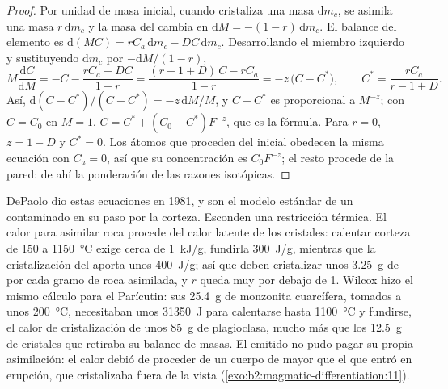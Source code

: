 \begin{proof}
Por unidad de masa inicial, cuando cristaliza una masa $\mathrm dm_c$, se asimila una masa
$r\,\mathrm dm_c$ y la masa del  cambia en $\mathrm dM =
-(1-r)\,\mathrm dm_c$. El balance del elemento es $\mathrm d(MC) = rC_a\,\mathrm dm_c -
DC\,\mathrm dm_c$. Desarrollando el miembro izquierdo y sustituyendo $\mathrm dm_c$ por
$-\mathrm dM/(1-r)$,
\[
M\frac{\mathrm dC}{\mathrm dM} = -C - \frac{rC_a - DC}{1-r}
= \frac{(r - 1 + D)\,C - rC_a}{1 - r} = -z\,\bigl(C - C^*\bigr),
\qquad C^* = \frac{rC_a}{r - 1 + D}.
\]
Así, $\mathrm d(C - C^*)/(C - C^*) = -z\,\mathrm dM/M$, y $C - C^*$ es proporcional
a $M^{-z}$; con $C = C_0$ en $M = 1$, $C = C^* + (C_0 - C^*)F^{-z}$, que es la
fórmula. Para $r = 0$, $z = 1 - D$ y $C^* = 0$. Los átomos que proceden del
 inicial obedecen la misma ecuación con $C_a = 0$, así que su concentración es
$C_0F^{-z}$; el resto procede de la pared: de ahí la ponderación de las razones isotópicas.
\end{proof}

DePaolo dio estas ecuaciones en 1981, y son el modelo estándar de un 
contaminado en su paso por la corteza. Esconden una restricción térmica. El calor
para asimilar roca procede del calor latente de los cristales: calentar corteza de
150 a \qty{1150}{\celsius} exige cerca de \qty{1}{kJ/g}, fundirla \qty{300}{J/g},
mientras que la cristalización del  aporta unos \qty{400}{J/g}; así que deben cristalizar unos \qty{3.25}{g} de
 por cada gramo de roca asimilada, y $r$ queda muy por debajo de 1.
Wilcox hizo el mismo cálculo para el Parícutin: sus \qty{25.4}{g} de monzonita
cuarcífera, tomados a unos \qty{200}{\celsius}, necesitaban unos \qty{31350}{J} para
calentarse hasta \qty{1100}{\celsius} y fundirse, el calor de cristalización de unos
\qty{85}{g} de plagioclasa, mucho más que los \qty{12.5}{g} de cristales que retiraba su balance
de masas. El  emitido no pudo pagar su propia asimilación:
el calor debió de proceder de un cuerpo de  mayor que el que entró en erupción,
que cristalizaba fuera de la vista (\cref{exo:b2:magmatic-differentiation:11}).

